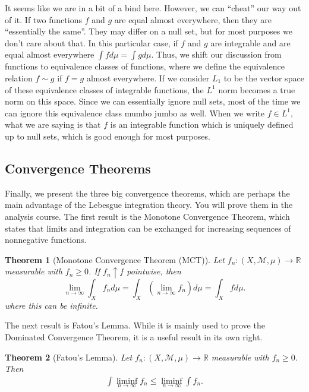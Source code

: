 \documentclass[12pt]{amsart}         %
\newtheorem{theorem}{Theorem}[section]
\theoremstyle{remark}
\newcommand{\R}{\mathbb{R}}
\begin{document}
It seems like we are in a bit of a bind here. However, we can ``cheat'' our way out of it. If two functions $f$ and $g$ are equal almost everywhere, then they are ``essentially the same''. They may differ on a null set, but for most purposes we don't care about that. In this particular case, if $f$ and $g$ are integrable and are equal almost everywhere $\int f d \mu= \int g d \mu$. Thus, we shift our discussion from functions to equivalence classes of functions, where we define the equivalence relation $f \sim g$ if $f = g$ almost everywhere. If we consider $L_1$ to be the vector space of these equivalence classes of integrable functions, the $L^1$ norm becomes a true norm on this space. Since we can essentially ignore null sets, most of the time we can ignore this equivalence class mumbo jumbo as well. When we write $f \in L^1$, what we are saying is that $f$ is an integrable function which is uniquely defined up to null sets, which is good enough for most purposes.

\subsection{Convergence Theorems}

Finally, we present the three big convergence theorems, which are perhaps the main advantage of the Lebesgue integration theory. You will prove them in the analysis course. The first result is the Monotone Convergence Theorem, which states that limits and integration can be exchanged for increasing sequences of nonnegative functions.

\begin{theorem}[Monotone Convergence Theorem (MCT)]
Let $f_n: (X,\mathcal{M},\mu) \rightarrow \R$ measurable with $f_n \geq 0$. If $f_n \uparrow f$ pointwise, then
\[
\lim_{n\rightarrow \infty} \int_X f_n d\mu = \int_X \left(\lim_{n\rightarrow \infty} f_n\right) d\mu= 
\int_X f d\mu.
\]
where this can be infinite.
\end{theorem}

The next result is Fatou's Lemma. While it is mainly used to prove the Dominated Convergence Theorem, it is a useful result in its own right. 

\begin{theorem}[Fatou's Lemma]
Let $f_n: (X,\mathcal{M},\mu) \rightarrow \R$ measurable with $f_n \geq 0$. Then
\begin{align*}
\int \liminf_{n\rightarrow \infty} f_n \leq \liminf_{n\rightarrow \infty} \int f_n.
\end{align*}
\end{theorem}
\end{document}
